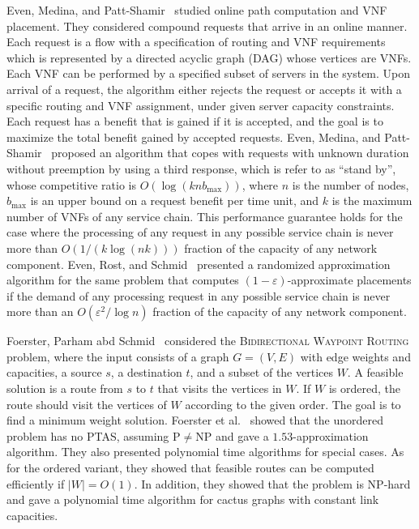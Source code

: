 \documentclass[11pt]{article}
\newcommand{\abs}[1]{\left| #1 \right|}
\newcommand{\eps}{\varepsilon}
\begin{document}
Even, Medina, and Patt-Shamir~\cite{EMP16} studied online path
computation and VNF placement.  They considered compound requests that
arrive in an online manner.  Each request is a flow with a
specification of routing and VNF requirements which is represented by
a directed acyclic graph (DAG) whose vertices are VNFs.  Each VNF can
be performed by a specified subset of servers in the system.  Upon
arrival of a request, the algorithm either rejects the request or
accepts it with a specific routing and VNF assignment, under given
server capacity constraints.  Each request has a benefit that is
gained if it is accepted, and the goal is to maximize the total
benefit gained by accepted requests.
%
Even, Medina, and Patt-Shamir~\cite{EMP16} proposed an algorithm that
copes with requests with unknown duration without preemption by using
a third response, which is refer to as “stand by”, whose competitive
ratio is $O(\log (knb_{\max}))$, where $n$ is the number of nodes,
$b_{\max}$ is an upper bound on a request benefit per time unit, and
$k$ is the maximum number of VNFs of any service chain.  This
performance guarantee holds for the case where the processing of any
request in any possible service chain is never more than
$O(1/(k \log (nk)))$ fraction of the capacity of any network
component.
%
Even, Rost, and Schmid~\cite{ERS16} presented a randomized
approximation algorithm for the same problem that computes
$(1-\eps)$-approximate placements if the demand of any processing
request in any possible service chain is never more than an
$O(\eps^2/\log n)$ fraction of the capacity of any network component.

Foerster, Parham abd Schmid~\cite{FPS17} considered the
\textsc{Bidirectional Waypoint Routing} problem, where the input
consists of a graph $G = (V,E)$ with edge weights and capacities, a
source $s$, a destination $t$, and a subset of the vertices $W$.  A
feasible solution is a route from $s$ to $t$ that visits the vertices
in $W$.  If $W$ is ordered, the route should visit the vertices of $W$
according to the given order.  The goal is to find a minimum weight
solution.
%
Foerster et al.~\cite{FPS17} showed that the unordered
problem has no PTAS, assuming P$\neq$NP and gave a
$1.53$-approximation algorithm.  They also presented polynomial time
algorithms for special cases.
%
As for the ordered variant, they showed that feasible routes can be
computed efficiently if $\abs{W} = O(1)$.  In addition, they showed
that the problem is NP-hard and gave a polynomial time algorithm for
cactus graphs with constant link capacities.
\end{document}

